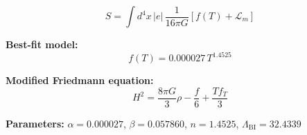 
\begin{equation}
  S = \int d^4x \, |e| \, \frac{1}{16\pi G} \left[ f(T) + \mathcal{L}_m \right]
\end{equation}

\textbf{Best-fit model:}
\begin{equation}
  f(T) = 0.000027 \, T^{1.4525}
\end{equation}

\textbf{Modified Friedmann equation:}
\begin{equation}
  H^2 = \frac{8\pi G}{3} \rho - \frac{f}{6} + \frac{T f_T}{3}
\end{equation}

\textbf{Parameters:}
$\alpha = 0.000027$, \quad
$\beta = 0.057860$, \quad
$n = 1.4525$, \quad
$\Lambda_{\text{BI}} = 32.4339$